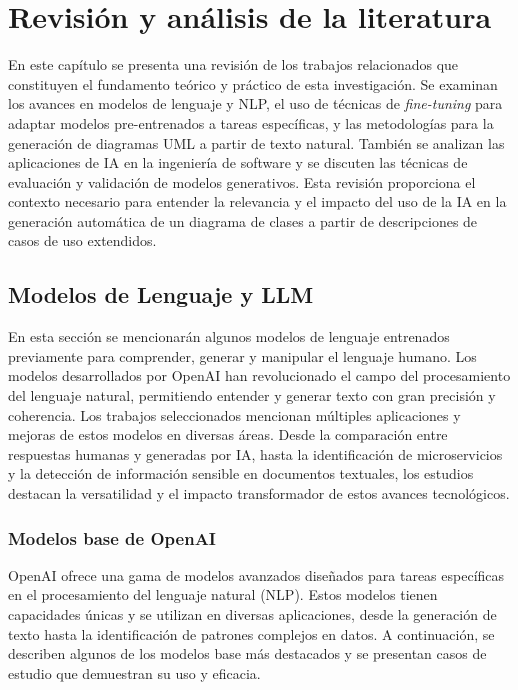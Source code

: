 \label{chapter:estado-arte}\chapter[Revisión y análisis de la literatura]{Revisión y análisis de la literatura}

En este capítulo se presenta una revisión de los trabajos relacionados que constituyen el fundamento teórico y práctico de esta investigación. Se examinan los avances en modelos de lenguaje y NLP, el uso de técnicas de \textit{fine-tuning} para adaptar modelos pre-entrenados a tareas específicas, y las metodologías para la generación de diagramas UML a partir de texto natural. También se analizan las aplicaciones de IA en la ingeniería de software y se discuten las técnicas de evaluación y validación de modelos generativos. Esta revisión proporciona el contexto necesario para entender la relevancia y el impacto del uso de la IA en la generación automática de un diagrama de clases a partir de descripciones de casos de uso extendidos.

\section{Modelos de Lenguaje y LLM}

En esta sección se mencionarán algunos modelos de lenguaje entrenados previamente para comprender, generar y manipular el lenguaje humano. Los modelos desarrollados por OpenAI han revolucionado el campo del procesamiento del lenguaje natural, permitiendo entender y generar texto con gran precisión y coherencia. Los trabajos seleccionados mencionan múltiples aplicaciones y mejoras de estos modelos en diversas áreas. Desde la comparación entre respuestas humanas y generadas por IA, hasta la identificación de microservicios y la detección de información sensible en documentos textuales, los estudios destacan la versatilidad y el impacto transformador de estos avances tecnológicos.

\subsection{Modelos base de OpenAI}

OpenAI ofrece una gama de modelos avanzados diseñados para tareas específicas en el procesamiento del lenguaje natural (NLP). Estos modelos tienen capacidades únicas y se utilizan en diversas aplicaciones, desde la generación de texto hasta la identificación de patrones complejos en datos. A continuación, se describen algunos de los modelos base más destacados y se presentan casos de estudio que demuestran su uso y eficacia. 

